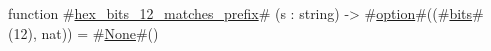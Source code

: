 function #\hyperref[sailRISCVzhexzybitszy12zymatcheszyprefix]{hex\_bits\_12\_matches\_prefix}# (s : string) -> #\hyperref[sailRISCVzoption]{option}#((#\hyperref[sailRISCVzbits]{bits}#(12), nat)) = #\hyperref[sailRISCVzNone]{None}#()
